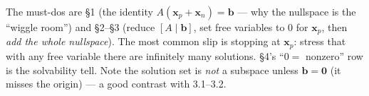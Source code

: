 \documentclass[10pt]{article}
\newcommand{\xx}{\mathbf{x}}
\newcommand{\bb}{\mathbf{b}}
\newcommand{\zero}{\mathbf{0}}
\begin{document}
\begin{teachernote}
The must-dos are \S1 (the identity $A(\xx_p+\xx_n)=\bb$ --- why the nullspace is the ``wiggle room'') and
\S2--\S3 (reduce $[A\mid\bb]$, set free variables to $0$ for $\xx_p$, then \emph{add the whole
nullspace}). The most common slip is stopping at $\xx_p$: stress that with any free variable there are
infinitely many solutions. \S4's ``$0=$ nonzero'' row is the solvability tell. Note the solution set is
\emph{not} a subspace unless $\bb=\zero$ (it misses the origin) --- a good contrast with 3.1--3.2.
\end{teachernote}
\end{document}
